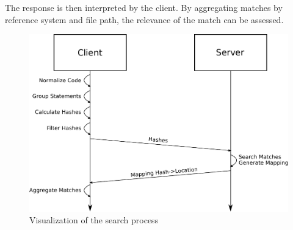 The response is then interpreted by the client.
By aggregating matches by reference system and file path, the relevance of the match can be assessed.
\begin{figure}[h]
	\centering
	\includegraphics[width=\linewidth]{figures/searching_copied_code.pdf}
	\caption{Visualization of the search process}\label{fig:search_activity}
\end{figure}